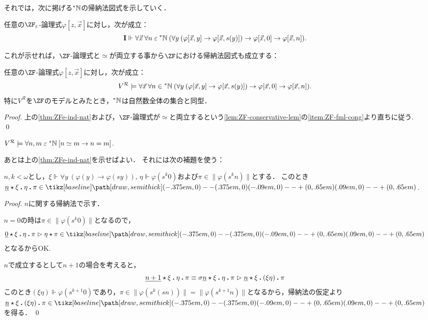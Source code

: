 \documentclass[realisability.tex]{subfiles}
\begin{document}
それでは，次に掲げる$\mathord{{}^{*}\mathbb{N}}$の帰納法図式を示していく．
\begin{theorem} \label{thm:ZFe-ind-nat}
 任意の$\ZF_{\varepsilon}$-論理式$\varphi[z, \vec{x}]$に対し，次が成立：
 \[
  \mathsf{\mathbf{I}} \Vdash \forall \vec{x}\: \forall n \mathrel{\varepsilon} \mathord{{}^{*}\mathbb{N}} \:(\forall y\: (\varphi[\vec{x}, y] \to \varphi[\vec{x}, s(y)]) \to \varphi[\vec{x}, 0] \to \varphi[\vec{x}, n]).
 \]
\end{theorem}
これが示せれば，$\ZF$-論理式と$\simeq$が両立する事から$\ZF$における帰納法図式も成立する：
\begin{corollary}\label{cor:ZF-ind-nat}
 任意の$\ZF$-論理式$\varphi[z, \vec{x}]$に対し，次が成立：
 \[
  V^{\mathcal{R}} \models \forall \vec{x}\: \forall n \in \mathord{{}^{*}\mathbb{N}} \:(\forall y\: (\varphi[\vec{x}, y] \to \varphi[\vec{x}, s(y)]) \to \varphi[\vec{x}, 0] \to \varphi[\vec{x}, n]).
 \]
 特に$V^{\mathcal{R}}$を$\ZF$のモデルとみたとき，$\mathord{{}^{*}\mathbb{N}}$は自然数全体の集合と同型．
\end{corollary}
\begin{proof}
 上の\cref{thm:ZFe-ind-nat}および，$\ZF$-論理式が$\simeq$と両立するという\cref{lem:ZF-conservative-lem}の\ref{item:ZF-fml-cong}より直ちに従う. \qed
\end{proof}
\begin{corollary}\label{cor:nat-ext-to-int}
 $V^{\mathcal{R}} \models \forall n, m \mathrel{\varepsilon} \mathord{{}^{*}\mathbb{N}}\:[n \simeq m \to n = m]$.
\end{corollary}

あとは上の\cref{thm:ZFe-ind-nat}を示せばよい．
それには次の補題を使う：
\begin{lemma}\label{lem:ZFe-ind-nat-aux}
 $n, k < \omega$とし，$\xi \Vdash \forall y\: (\varphi(y) \to \varphi(s y))$, $\eta \Vdash \varphi(s^k 0)$および$\pi \in \|\varphi(s^k n)\|$とする．
 このとき$\KVM{{{\num n}} \xi \eta \pi} \in \pole$.
\end{lemma}
\begin{proof}
 $n$に関する帰納法で示す．

 $n = 0$の時は$\pi \in \|\varphi(s^k 0)\|$となるので，
 \[
  \KVM{{{\num 0}} \xi \eta \pi} \redsto \KVM{\eta \pi} \in \pole
 \]
 となるからOK.

 $n$で成立するとして$n + 1$の場合を考えると，
 \[
  \KVM{{{\num{n+1}}} \xi \eta \pi} \equiv
  \KVM{{\sigma \num{n}} \xi \eta \pi} \redsto
  \KVM{{{\num{n}}} \xi {(\xi \eta)} \pi}
 \]
 このとき$(\xi\eta) \Vdash \varphi(s^{k+1} 0)$であり，$\pi \in \|\varphi(s^k(s n))\| = \|\varphi(s^{k+1} n)\|$となるから，帰納法の仮定より$\KVM{{{\num{n}}} \xi {(\xi \eta)} \pi} \in \pole$を得る． \qed
\end{proof}
\end{document}

